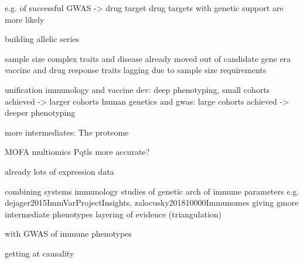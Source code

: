 \begin{outline}

        \3 e.g. of successful GWAS -> drug target
            \4 drug targets with genetic support are more likely

        \3 building allelic series

sample size
    complex traits and disease already moved out of candidate gene era
    vaccine and drug response traits lagging due to sample size requirements

unification
    immunology and vaccine dev: deep phenotyping, small cohorts achieved -> larger cohorts
    human genetics and gwas: large cohorts achieved -> deeper phenotyping

    more intermediates:
        The proteome

    MOFA
    multiomics
        Pqtls more accurate?

    already lots of expression data

    combining systems immunology studies of genetic arch of immune parameters
            e.g. dejager2015ImmVarProjectInsights, zalocusky201810000Immunomes
        giving gmore intermediate phenotypes
        layering of evidence (triangulation)

    with GWAS of immune phenotypes

    getting at causality

\end{outline}

